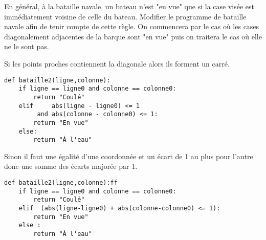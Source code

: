 \begin{Exercise}[title=Amélioration]
En général, à la bataille navale, un bateau n'est "en vue" que si la case visée est immédiatement voisine de celle du bateau. Modifier le programme de bataille navale afin de tenir compte de cette règle. On commencera par le cas où les cases diagonalement adjacentes de la barque sont "en vue" puis on traitera le cas où elle ne le sont pas. 
\end{Exercise}
\begin{Answer}
Si les points proches contiennent la diagonale alors ils forment un carré.
\begin{lstlisting}
def bataille2(ligne,colonne):
    if ligne == ligne0 and colonne == colonne0:
        return "Coulé"
    elif     abs(ligne - ligne0) <= 1 
         and abs(colonne - colonne0) <= 1:
        return "En vue"
    else:
        return "À l'eau"
\end{lstlisting}

Sinon il faut une égalité d'une coordonnée et un écart de 1 au plus pour l'autre donc une somme des écarts majorée par 1.
\begin{lstlisting}
def bataille2(ligne,colonne):ff
    if ligne == ligne0 and colonne == colonne0:
        return "Coulé"
    elif  (abs(ligne-ligne0) + abs(colonne-colonne0) <= 1):
        return "En vue"
    else :
        return "À l'eau"
\end{lstlisting}
\end{Answer}
